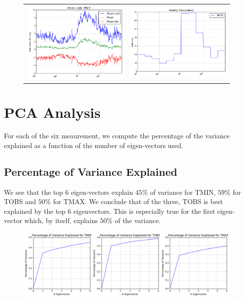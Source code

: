 \documentclass{article}
\begin{document}
\begin{figure}[H]
\centering
\begin{tabular}{cc}
\includegraphics[width=7.5cm]{../figures/1_3_precipitation_daily} &
\includegraphics[width=7.5cm]{../figures/1_3_precipitation_monthly}
\end{tabular}
\end{figure}


\section*{PCA Analysis}
For each of the six meaurement, we compute the percentage of the variance explained as a function of the number of eigen-vectors used. \\

\subsection*{Percentage of Variance Explained}

We see that the top $6$ eigen-vectors explain $45\%$ of variance for TMIN, $59\%$ for TOBS and $50\%$ for TMAX.
We conclude that of the three, TOBS is best explained by the top 6 eigenvectors. This is especially true for the first eigen-vector which, by itself, explains $50\%$ of the variance. \\

\begin{figure}[H]
\centering
\includegraphics[width=15cm]{../figures/2_1_pca_temperature_explain}
\end{figure}
\end{document}
